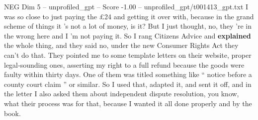 \begin{textsample}{NEG Dim 5 – unprofiled\_gpt – Score -1.00 – unprofiled\_gpt/t001413\_gpt.txt}  \label{ex:f5_neg_006}
I was so close to just paying the £24 and getting it over with, because in the grand scheme of things it ’s not a lot of money, is it?
But I just thought, no, they ’re in the wrong here and I ’m not paying it.
So I rang Citizens Advice and \textbf{explained} the whole thing, and they said no, under the new Consumer Rights Act they can't do that.
They pointed me to some template letters on their website, proper legal‑sounding ones, asserting my right to a full refund because the goods were faulty within thirty days.
One of them was titled something like “ notice before a county court claim ” or similar.
So I used that, adapted it, and sent it off, and in the letter I also asked them about independent dispute resolution, you know, what their process was for that, because I wanted it all done properly and by the book.

\end{textsample}

